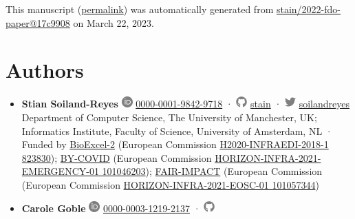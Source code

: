 This manuscript
(\href{https://stain.github.io/2022-fdo-paper/v/17c99087d5562cf949ae5952e872d5d04271aae4/}{permalink})
was automatically generated
from \href{https://github.com/stain/2022-fdo-paper/tree/17c99087d5562cf949ae5952e872d5d04271aae4}{stain/2022-fdo-paper@17c9908}
on March 22, 2023.

\hypertarget{authors}{%
\section*{Authors}\label{authors}}

\begin{itemize}
\item
  \textbf{Stian Soiland-Reyes}
  \includegraphics[width=0.16667in,height=0.16667in]{images/orcid.svg}
  \href{https://orcid.org/0000-0001-9842-9718}{0000-0001-9842-9718}
  · \includegraphics[width=0.16667in,height=0.16667in]{images/github.svg}
  \href{https://github.com/stain}{stain}
  · \includegraphics[width=0.16667in,height=0.16667in]{images/twitter.svg}
  \href{https://twitter.com/soilandreyes}{soilandreyes}
  Department of Computer Science, The University of Manchester, UK; Informatics Institute, Faculty of Science, University of Amsterdam, NL
  · Funded by \href{https://bioexcel.eu/}{BioExcel-2} (European Commission \href{https://cordis.europa.eu/project/id/823830}{H2020-INFRAEDI-2018-1 823830}); \href{https://by-covid.eu/}{BY-COVID} (European Commission \href{https://cordis.europa.eu/project/id/101046203}{HORIZON-INFRA-2021-EMERGENCY-01 101046203}); \href{http://www.fair-impact.eu/}{FAIR-IMPACT} (European Commission (European Commission \href{https://cordis.europa.eu/project/id/101057344}{HORIZON-INFRA-2021-EOSC-01 101057344})
\item
  \textbf{Carole Goble}
  \includegraphics[width=0.16667in,height=0.16667in]{images/orcid.svg}
  \href{https://orcid.org/0000-0003-1219-2137}{0000-0003-1219-2137}
  · \includegraphics[width=0.16667in,height=0.16667in]{images/github.svg}

\end{itemize}
